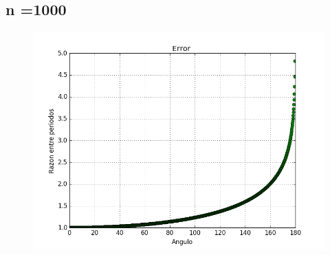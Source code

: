 \documentclass[12pt]{article}
\begin{document}
\subsection{n =1000}
\begin{figure}[H]
\includegraphics[scale=.6]{n1000}
\end{figure}
\end{document}

